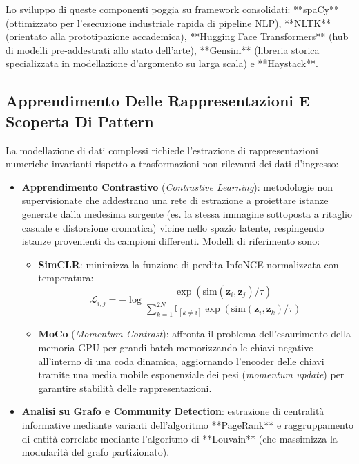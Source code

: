 \documentclass[11pt, a4paper]{article}
\begin{document}
Lo sviluppo di queste componenti poggia su framework consolidati: **spaCy** (ottimizzato per l'esecuzione industriale rapida di pipeline NLP), **NLTK** (orientato alla prototipazione accademica), **Hugging Face Transformers** (hub di modelli pre-addestrati allo stato dell'arte), **Gensim** (libreria storica specializzata in modellazione d'argomento su larga scala) e **Haystack**.


\subsection{Apprendimento Delle Rappresentazioni E Scoperta Di Pattern}

La modellazione di dati complessi richiede l'estrazione di rappresentazioni numeriche invarianti rispetto a trasformazioni non rilevanti dei dati d'ingresso:
\begin{itemize}
    \item \textbf{Apprendimento Contrastivo} (\emph{Contrastive Learning}): metodologie non supervisionate che addestrano una rete di estrazione a proiettare istanze generate dalla medesima sorgente (es. la stessa immagine sottoposta a ritaglio casuale e distorsione cromatica) vicine nello spazio latente, respingendo istanze provenienti da campioni differenti. Modelli di riferimento sono:
    \begin{itemize}
        \item \textbf{SimCLR}: minimizza la funzione di perdita InfoNCE normalizzata con temperatura:
        \begin{equation}
            \mathcal{L}_{i, j} = -\log \frac{\exp\left( \text{sim}(\bm{z}_i, \bm{z}_j) / \tau \right)}{\sum_{k=1}^{2N} \mathbb{I}_{[k \neq i]} \exp\left( \text{sim}(\bm{z}_i, \bm{z}_k) / \tau \right)}
        \end{equation}
        \item \textbf{MoCo} (\emph{Momentum Contrast}): affronta il problema dell'esaurimento della memoria GPU per grandi batch memorizzando le chiavi negative all'interno di una coda dinamica, aggiornando l'encoder delle chiavi tramite una media mobile esponenziale dei pesi (\emph{momentum update}) per garantire stabilità delle rappresentazioni.
    \end{itemize}
    \item \textbf{Analisi su Grafo e Community Detection}: estrazione di centralità informative mediante varianti dell'algoritmo **PageRank** e raggruppamento di entità correlate mediante l'algoritmo di **Louvain** (che massimizza la modularità del grafo partizionato).
\end{itemize}
\end{document}
